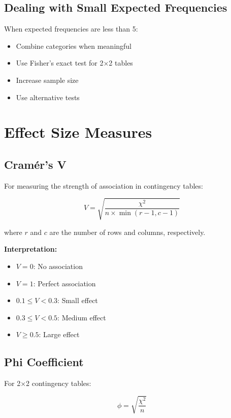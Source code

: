\documentclass[twoside]{book}
\begin{document}
\subsection{Dealing with Small Expected Frequencies}

When expected frequencies are less than 5:
\begin{itemize}
    \item Combine categories when meaningful
    \item Use Fisher's exact test for 2×2 tables
    \item Increase sample size
    \item Use alternative tests
\end{itemize}

\section{Effect Size Measures}

\subsection{Cramér's V}

For measuring the strength of association in contingency tables:

\begin{equation}
V = \sqrt{\frac{\chi^2}{n \times \min(r-1, c-1)}}
\end{equation}

where $r$ and $c$ are the number of rows and columns, respectively.

\textbf{Interpretation:}
\begin{itemize}
    \item $V = 0$: No association
    \item $V = 1$: Perfect association
    \item $0.1 \leq V < 0.3$: Small effect
    \item $0.3 \leq V < 0.5$: Medium effect
    \item $V \geq 0.5$: Large effect
\end{itemize}

\subsection{Phi Coefficient}

For 2×2 contingency tables:

\begin{equation}
\phi = \sqrt{\frac{\chi^2}{n}}
\end{equation}
\end{document}
